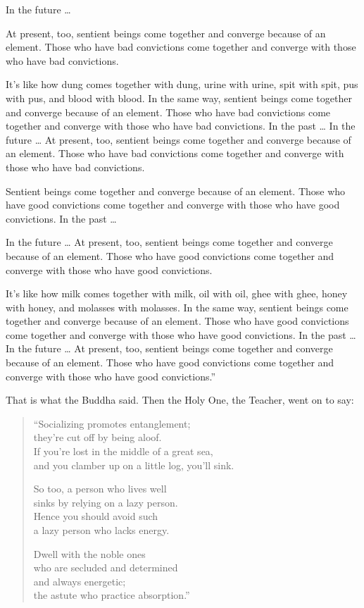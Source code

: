 \documentclass[12pt,openany]{book}%
\begin{document}
In the future … 

At present, too, sentient beings come together and converge because of an element. Those who have bad convictions come together and converge with those who have bad convictions. 

It’s like how dung comes together with dung, urine with urine, spit with spit, pus with pus, and blood with blood. In the same way, sentient beings come together and converge because of an element. Those who have bad convictions come together and converge with those who have bad convictions. In the past … In the future … At present, too, sentient beings come together and converge because of an element. Those who have bad convictions come together and converge with those who have bad convictions. 

Sentient beings come together and converge because of an element. Those who have good convictions come together and converge with those who have good convictions. In the past … 

In the future … At present, too, sentient beings come together and converge because of an element. Those who have good convictions come together and converge with those who have good convictions. 

It’s like how milk comes together with milk, oil with oil, ghee with ghee, honey with honey, and molasses with molasses. In the same way, sentient beings come together and converge because of an element. Those who have good convictions come together and converge with those who have good convictions. In the past … In the future … At present, too, sentient beings come together and converge because of an element. Those who have good convictions come together and converge with those who have good convictions.” 

That is what the Buddha said. Then the Holy One, the Teacher, went on to say: 

\begin{verse}%
“Socializing promotes entanglement; \\
they’re cut off by being aloof. \\
If you’re lost in the middle of a great sea, \\
and you clamber up on a little log, you’ll sink. 

So too, a person who lives well \\
sinks by relying on a lazy person. \\
Hence you should avoid such \\
a lazy person who lacks energy. 

Dwell with the noble ones \\
who are secluded and determined \\
and always energetic; \\
the astute who practice absorption.” 

%
\end{verse}
\end{document}
